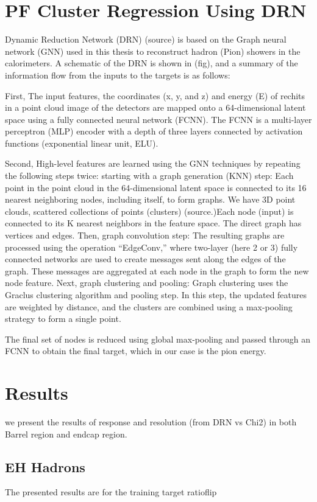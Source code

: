 \section{PF Cluster Regression Using DRN}
Dynamic Reduction Network (DRN) (source) is based on the Graph neural network (GNN) used in this thesis to reconstruct hadron (Pion) showers in the calorimeters. A schematic of the DRN is shown in (fig), and a summary of the information flow from the inputs to the targets is as follows:   

First, The input features, the coordinates (x, y, and z) and energy (E) of rechits in a point cloud image of the detectors are mapped onto a 64-dimensional latent space using a fully connected neural network (FCNN).  The FCNN is a multi-layer perceptron (MLP) encoder with a depth of three layers connected by activation functions (exponential linear unit, ELU).

Second, High-level features are learned using the GNN techniques by repeating the following steps twice: starting with a graph generation (KNN) step: Each point in the point cloud in the 64-dimensional latent space is connected to its 16 nearest neighboring nodes, including itself, to form graphs. We have 3D point clouds, scattered collections of points (clusters) (source.)Each node (input) is connected to its K nearest neighbors in the feature space. The direct graph has vertices and edges.%
Then, graph convolution step: The resulting graphs are processed using the operation “EdgeConv,” where two-layer (here 2 or 3) fully connected networks are used to create messages sent along the edges of the graph. These messages are aggregated at each node in the graph to form the new node feature.%
Next, graph clustering and pooling: Graph clustering uses the Graclus clustering algorithm and pooling step. In this step, the updated features are weighted by distance, and the clusters are combined using a max-pooling strategy to form a single point.  

The final set of nodes is reduced using global max-pooling and passed through an FCNN to obtain the final target, which in our case is the pion energy.   
\section{Results}
we present the results of response and resolution (from DRN vs Chi2) in  both Barrel region and endcap region.

\subsection{EH Hadrons}
The presented results are for the training target ratioflip


